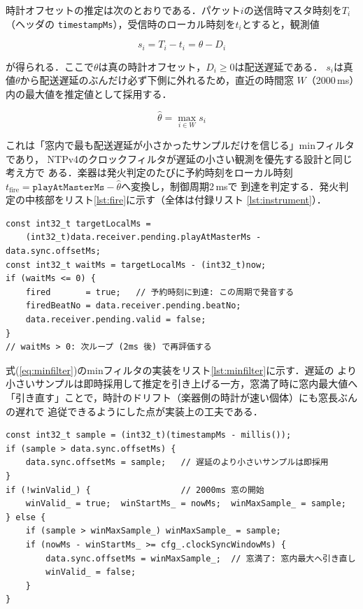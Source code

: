 \documentclass[uplatex,dvipdfmx]{jlreq}
\newcommand{\code}[1]{\texttt{#1}}
\begin{document}
時計オフセットの推定は次のとおりである．パケット$i$の送信時マスタ時刻を$T_{i}$
（ヘッダの \code{timestampMs}），受信時のローカル時刻を$t_{i}$とすると，観測値

\begin{equation}
  s_{i} = T_{i} - t_{i} = \theta - D_{i}
  \label{eq:offset-sample}
\end{equation}

が得られる．ここで$\theta$は真の時計オフセット，$D_{i} \ge 0$は配送遅延である．
$s_{i}$は真値$\theta$から配送遅延のぶんだけ必ず下側に外れるため，直近の時間窓
$W$（2000\,ms）内の最大値を推定値として採用する．

\begin{equation}
  \hat{\theta} = \max_{i \in W} s_{i}
  \label{eq:minfilter}
\end{equation}

これは「窓内で最も配送遅延が小さかったサンプルだけを信じる」minフィルタであり，
NTPv4のクロックフィルタが遅延の小さい観測を優先する設計\cite{rfc5905}と同じ考え方で
ある．楽器は発火判定のたびに予約時刻をローカル時刻
$t_{\mathrm{fire}} = \code{playAtMasterMs} - \hat{\theta}$へ変換し，制御周期2\,msで
到達を判定する．発火判定の中核部をリスト\ref{lst:fire}に示す（全体は付録リスト
\ref{lst:instrument}）．

\begin{lstlisting}[caption={楽器ノードの発音予約発火判定（抜粋）},label={lst:fire}]
const int32_t targetLocalMs =
    (int32_t)data.receiver.pending.playAtMasterMs - data.sync.offsetMs;
const int32_t waitMs = targetLocalMs - (int32_t)now;
if (waitMs <= 0) {
    fired       = true;   // 予約時刻に到達: この周期で発音する
    firedBeatNo = data.receiver.pending.beatNo;
    data.receiver.pending.valid = false;
}
// waitMs > 0: 次ループ (2ms 後) で再評価する
\end{lstlisting}

式(\ref{eq:minfilter})のminフィルタの実装をリスト\ref{lst:minfilter}に示す．遅延の
より小さいサンプルは即時採用して推定を引き上げる一方，窓満了時に窓内最大値へ
「引き直す」ことで，時計のドリフト（楽器側の時計が速い個体）にも窓長ぶんの遅れで
追従できるようにした点が実装上の工夫である．

\begin{lstlisting}[caption={時計オフセットのminフィルタ（抜粋）},label={lst:minfilter}]
const int32_t sample = (int32_t)(timestampMs - millis());
if (sample > data.sync.offsetMs) {
    data.sync.offsetMs = sample;   // 遅延のより小さいサンプルは即採用
}
if (!winValid_) {                  // 2000ms 窓の開始
    winValid_ = true;  winStartMs_ = nowMs;  winMaxSample_ = sample;
} else {
    if (sample > winMaxSample_) winMaxSample_ = sample;
    if (nowMs - winStartMs_ >= cfg_.clockSyncWindowMs) {
        data.sync.offsetMs = winMaxSample_;  // 窓満了: 窓内最大へ引き直し
        winValid_ = false;
    }
}
\end{lstlisting}
\end{document}
